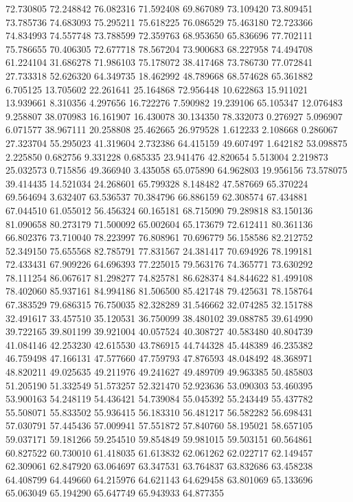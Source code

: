 72.730805
72.248842
76.082316
71.592408
69.867089
73.109420
73.809451
73.785736
74.683093
75.295211
75.618225
76.086529
75.463180
72.723366
74.834993
74.557748
73.788599
72.359763
68.953650
65.836696
77.702111
75.786655
70.406305
72.677718
78.567204
73.900683
68.227958
74.494708
61.224104
31.686278
71.986103
75.178072
38.417468
73.786730
77.072841
27.733318
52.626320
64.349735
18.462992
48.789668
68.574628
65.361882
6.705125
13.705602
22.261641
25.164868
72.956448
10.622863
15.911021
13.939661
8.310356
4.297656
16.722276
7.590982
19.239106
65.105347
12.076483
9.258807
38.070983
16.161907
16.430078
30.134350
78.332073
0.276927
5.096907
6.071577
38.967111
20.258808
25.462665
26.979528
1.612233
2.108668
0.286067
27.323704
55.295023
41.319604
2.732386
64.415159
49.607497
1.642182
53.098875
2.225850
0.682756
9.331228
0.685335
23.941476
42.820654
5.513004
2.219873
25.032573
0.715856
49.366940
3.435058
65.075890
64.962803
19.956156
73.578075
39.414435
14.521034
24.268601
65.799328
8.148482
47.587669
65.370224
69.564694
3.632407
63.536537
70.384796
66.886159
62.308574
67.434881
67.044510
61.055012
56.456324
60.165181
68.715090
79.289818
83.150136
81.090658
80.273179
71.500092
65.002604
65.173679
72.612411
80.361136
66.802376
73.710040
78.223997
76.808961
70.696779
56.158586
82.212752
52.349150
75.655568
82.785791
77.831567
24.381417
70.694926
78.199181
72.433431
67.909226
64.696393
77.225015
79.563176
74.365771
73.630292
78.111254
86.067617
81.298277
74.825781
86.628374
84.844622
81.499108
78.402060
85.937161
84.994186
81.506500
85.421748
79.425631
78.158764
67.383529
79.686315
76.750035
82.328289
31.546662
32.074285
32.151788
32.491617
33.457510
35.120531
36.750099
38.480102
39.088785
39.614990
39.722165
39.801199
39.921004
40.057524
40.308727
40.583480
40.804739
41.084146
42.253230
42.615530
43.786915
44.744328
45.448389
46.235382
46.759498
47.166131
47.577660
47.759793
47.876593
48.048492
48.368971
48.820211
49.025635
49.211976
49.241627
49.489709
49.963385
50.485803
51.205190
51.332549
51.573257
52.321470
52.923636
53.090303
53.460395
53.900163
54.248119
54.436421
54.739084
55.045392
55.243449
55.437782
55.508071
55.833502
55.936415
56.183310
56.481217
56.582282
56.698431
57.030791
57.445436
57.009941
57.551872
57.840760
58.195021
58.657105
59.037171
59.181266
59.254510
59.854849
59.981015
59.503151
60.564861
60.827522
60.730010
61.418035
61.613832
62.061262
62.022717
62.149457
62.309061
62.847920
63.064697
63.347531
63.764837
63.832686
63.458238
64.408799
64.449660
64.215976
64.621143
64.629458
63.801069
65.133696
65.063049
65.194290
65.647749
65.943933
64.877355
